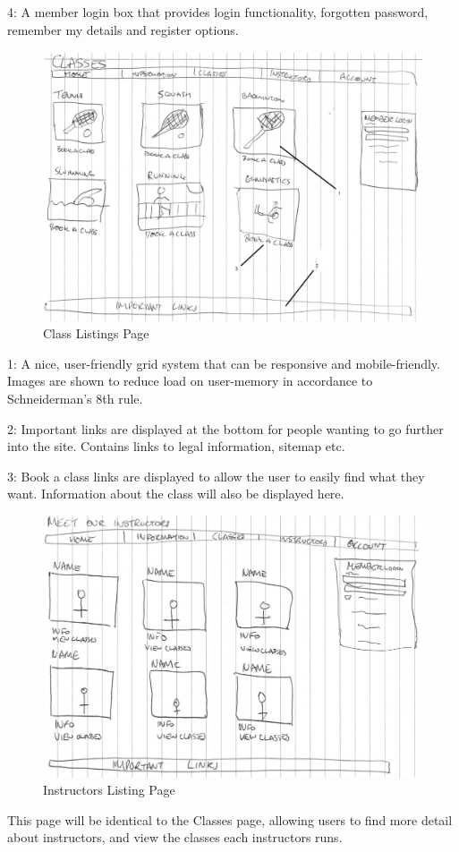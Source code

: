 \documentclass[11pt, article]{article}
\begin{document}
4: A member login box that provides login functionality, forgotten password, remember my details and register options.
\newpage
			\begin{figure}[ht!]
	\includegraphics[scale=0.7]{images/classpage}
 	\caption{Class Listings Page}
	\end{figure}	
1: A nice, user-friendly grid system that can be responsive and mobile-friendly. Images are shown to reduce load on user-memory in accordance to Schneiderman's 8th rule.

2: Important links are displayed at the bottom for people wanting to go further into the site. Contains links to legal information, sitemap etc. 

3: Book a class links are displayed to allow the user to easily find what they want. Information about the class will also be displayed here.
\newpage
			\begin{figure}[ht!]
	\includegraphics[scale=0.7]{images/instructorpage}
 	\caption{Instructors Listing Page}
	\end{figure}
	This page will be identical to the Classes page, allowing users to find more detail about instructors, and view the classes each instructors runs.
	\newpage
	
\end{document}
